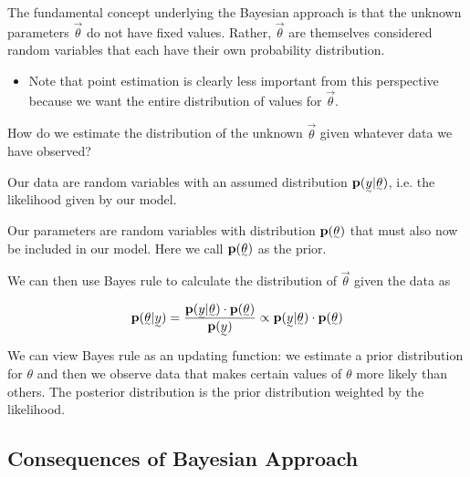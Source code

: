 The fundamental concept underlying the Bayesian approach is that the unknown parameters $\vec{\theta}$ do not have fixed values. Rather, $\vec{\theta}$ are themselves considered random variables that each have their own probability distribution. 
\begin{itemize}
    \item Note that point estimation is clearly less important from this perspective because we want the entire distribution of values for $\vec{\theta}$.
\end{itemize}

How do we estimate the distribution of the unknown $\vec{\theta}$ given whatever data we have observed?

Our data are random variables with an assumed distribution $\p(\vec{y}| \vec{\theta})$, i.e. the likelihood given by our model.

Our parameters are random variables with distribution $\p(\vec{\theta})$ that must also now be included in our model. Here we call $\p(\vec{\theta})$ as the prior.

We can then use Bayes rule to calculate the distribution of $\vec{\theta}$ given the data as

\[
\p(\vec{\theta} | \vec{y}) = \frac{\p(\vec{y} | \vec{\theta}) \cdot \p(\vec{\theta})}{\p(\vec{y})} \propto  \p(\vec{y} | \vec{\theta}) \cdot \p(\vec{\theta})
\]

We can view Bayes rule as an updating function: we estimate a prior distribution for $\theta$ and then we observe data that makes certain values of $\theta$ more likely than others. The posterior distribution is the prior distribution weighted by the likelihood.

\subsection{Consequences of Bayesian Approach}


